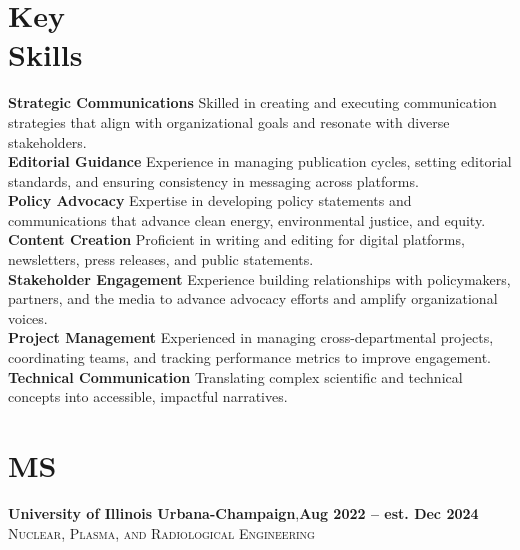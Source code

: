 \documentclass[margin,line]{resume}
\begin{document}
\begin{resume}
    \section{\mysidestyle Key\\Skills}
        \textbf{Strategic Communications} Skilled in creating and executing communication strategies that align with organizational goals and resonate with diverse stakeholders.\vspace{1mm}\\
        \textbf{Editorial Guidance} Experience in managing publication cycles, setting editorial standards, and ensuring consistency in messaging across platforms.\vspace{1mm}\\
        \textbf{Policy Advocacy} Expertise in developing policy statements and communications that advance clean energy, environmental justice, and equity.\vspace{1mm}\\
        \textbf{Content Creation} Proficient in writing and editing for digital platforms, newsletters, press releases, and public statements.\vspace{1mm}\\
        \textbf{Stakeholder Engagement} Experience building relationships with policymakers, partners, and the media to advance advocacy efforts and amplify organizational voices.\vspace{1mm}\\
        \textbf{Project Management} Experienced in managing cross-departmental projects, coordinating teams, and tracking performance metrics to improve engagement.\vspace{1mm}\\
        \textbf{Technical Communication} Translating complex scientific and technical concepts into accessible, impactful narratives.\vspace{1mm}
    \section{\mysidestyle MS}
    \textbf{University of Illinois Urbana-Champaign},\hfill\textbf{Aug 2022 -- est. Dec 2024}\\
    \textsc{Nuclear, Plasma, and Radiological Engineering}\\
    \vspace{-5.5mm}

\end{resume}
\end{document}
